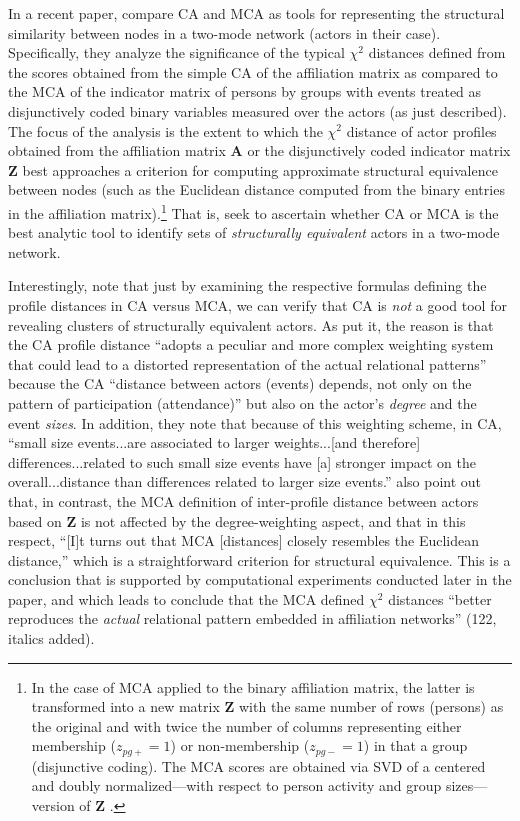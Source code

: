 \documentclass[a4paper,fleqn]{cas-sc}
\begin{document}
In a recent paper, \citet{desposito2014comparison} compare CA and MCA as tools for representing the structural similarity between nodes in a two-mode network (actors in their case). Specifically, they analyze the significance of the typical $\chi^2$ distances defined from the scores obtained from the simple CA of the affiliation matrix as compared to the MCA of the indicator matrix of persons by groups with events treated as disjunctively coded binary variables measured over the actors (as just described). The focus of the analysis is the extent to which the $\chi^2$ distance of actor profiles obtained from the affiliation matrix $\mathbf{A}$ or the disjunctively coded indicator matrix $\mathbf{Z}$ best approaches a criterion for computing approximate structural equivalence between nodes (such as the Euclidean distance computed from the binary entries in the affiliation matrix).\footnote{In the case of MCA applied to the binary affiliation matrix, the latter is transformed into a new matrix $\mathbf{Z}$ with the same number of rows (persons) as the original and with twice the number of columns representing either membership ($z_{pg+} = 1$) or non-membership ($z_{pg-} = 1$) in that a group (disjunctive coding). The MCA scores are obtained via SVD of a centered and doubly normalized---with respect to person activity and group sizes---version of $\mathbf{Z}$ \citep{desposito2014use}.}  That is, \citet{desposito2014comparison} seek to ascertain whether CA or MCA is the best analytic tool to identify sets of \textit{structurally equivalent} actors in a two-mode network. 

Interestingly, \citet[115]{desposito2014comparison} note that just by examining the respective formulas defining the profile distances in CA versus MCA, we can verify that CA is \textit{not} a good tool for revealing clusters of structurally equivalent actors. As \citet{desposito2014comparison} put it, the reason is that the CA profile distance ``adopts a peculiar and more complex weighting system that could lead to a distorted representation of the actual relational patterns'' because the CA ``distance between actors (events) depends, not only on the pattern of participation (attendance)'' but also on the actor's \textit{degree} and the event \textit{sizes}. In addition, they note that because of this weighting scheme, in CA, ``small size events...are associated to larger weights...[and therefore] differences...related to such small size events have [a] stronger impact on the overall...distance than differences related to larger size events.'' \citet{desposito2014comparison} also point out that, in contrast, the MCA definition of inter-profile distance between actors based on $\mathbf{Z}$ is not affected by the degree-weighting aspect, and that in this respect, ``[I]t turns out that MCA [distances] closely resembles the Euclidean distance,'' which is a straightforward criterion for structural equivalence. This is a conclusion that is supported by computational experiments conducted later in the paper, and which leads \citet{desposito2014comparison} to conclude that the MCA defined  $\chi^2$ distances ``better reproduces the \textit{actual} relational pattern embedded in affiliation networks'' (122, italics added).
\end{document}
